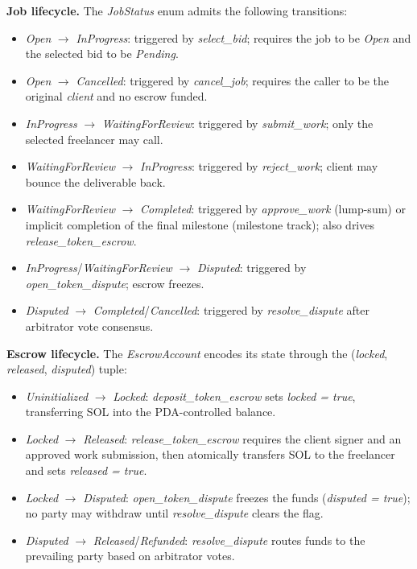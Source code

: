 \textbf{Job lifecycle.} The \emph{JobStatus} enum admits the following transitions:
\begin{itemize}[noitemsep]
    \item \emph{Open} $\to$ \emph{InProgress}: triggered by \emph{select\_bid}; requires the job to be \emph{Open} and the selected bid to be \emph{Pending}.
    \item \emph{Open} $\to$ \emph{Cancelled}: triggered by \emph{cancel\_job}; requires the caller to be the original \emph{client} and no escrow funded.
    \item \emph{InProgress} $\to$ \emph{WaitingForReview}: triggered by \emph{submit\_work}; only the selected freelancer may call.
    \item \emph{WaitingForReview} $\to$ \emph{InProgress}: triggered by \emph{reject\_work}; client may bounce the deliverable back.
    \item \emph{WaitingForReview} $\to$ \emph{Completed}: triggered by \emph{approve\_work} (lump-sum) or implicit completion of the final milestone (milestone track); also drives \emph{release\_token\_escrow}.
    \item \emph{InProgress}/\emph{WaitingForReview} $\to$ \emph{Disputed}: triggered by \emph{open\_token\_dispute}; escrow freezes.
    \item \emph{Disputed} $\to$ \emph{Completed}/\emph{Cancelled}: triggered by \emph{resolve\_dispute} after arbitrator vote consensus.
\end{itemize}

\textbf{Escrow lifecycle.} The \emph{EscrowAccount} encodes its state through the (\emph{locked}, \emph{released}, \emph{disputed}) tuple:
\begin{itemize}[noitemsep]
    \item \emph{Uninitialized} $\to$ \emph{Locked}: \emph{deposit\_token\_escrow} sets \emph{locked = true}, transferring SOL into the PDA-controlled balance.
    \item \emph{Locked} $\to$ \emph{Released}: \emph{release\_token\_escrow} requires the client signer and an approved work submission, then atomically transfers SOL to the freelancer and sets \emph{released = true}.
    \item \emph{Locked} $\to$ \emph{Disputed}: \emph{open\_token\_dispute} freezes the funds (\emph{disputed = true}); no party may withdraw until \emph{resolve\_dispute} clears the flag.
    \item \emph{Disputed} $\to$ \emph{Released}/\emph{Refunded}: \emph{resolve\_dispute} routes funds to the prevailing party based on arbitrator votes.
\end{itemize}

